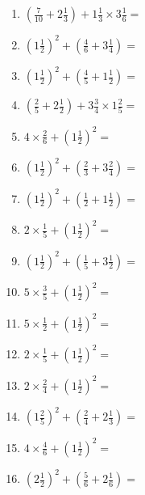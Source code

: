 \documentclass[12pt]{article}
\begin{document}
\begin{enumerate}
\item \large $ (\frac{7}{10} + 2 \frac{1}{3}) + 1 \frac{1}{3} \times 3 \frac{1}{6} = $ \vspace{1.8cm}
\item \large $ (1 \frac{1}{2})^2 + (\frac{4}{6} + 3 \frac{1}{4}) = $ \vspace{1.8cm}
\item \large $ (1 \frac{1}{2})^2 + (\frac{4}{5} + 1 \frac{1}{2}) = $ \vspace{1.8cm}
\item \large $ (\frac{2}{5} + 2 \frac{1}{2}) + 3 \frac{3}{4} \times 1 \frac{2}{5} = $ \vspace{1.8cm}
\item \large $ 4 \times \frac{2}{6} + (1 \frac{1}{2})^2 = $ \vspace{1.8cm}
\item \large $ (1 \frac{1}{2})^2 + (\frac{2}{3} + 3 \frac{2}{4}) = $ \vspace{1.8cm}
\newpage
\item \large $ (1 \frac{1}{2})^2 + (\frac{1}{2} + 1 \frac{1}{2}) = $ \vspace{1.8cm}
\item \large $ 2 \times \frac{1}{5} + (1 \frac{1}{2})^2 = $ \vspace{1.8cm}
\item \large $ (1 \frac{1}{2})^2 + (\frac{1}{5} + 3 \frac{1}{2}) = $ \vspace{1.8cm}
\item \large $ 5 \times \frac{3}{5} + (1 \frac{1}{2})^2 = $ \vspace{1.8cm}
\item \large $ 5 \times \frac{1}{2} + (1 \frac{1}{2})^2 = $ \vspace{1.8cm}
\item \large $ 2 \times \frac{1}{5} + (1 \frac{1}{2})^2 = $ \vspace{1.8cm}
\item \large $ 2 \times \frac{2}{4} + (1 \frac{1}{2})^2 = $ \vspace{1.8cm}
\item \large $ (1 \frac{2}{5})^2 + (\frac{2}{4} + 2 \frac{1}{3}) = $ \vspace{1.8cm}
\item \large $ 4 \times \frac{4}{6} + (1 \frac{1}{2})^2 = $ \vspace{1.8cm}
\item \large $ (2 \frac{1}{2})^2 + (\frac{5}{6} + 2 \frac{1}{6}) = $ \vspace{1.8cm}

\end{enumerate}
\end{document}
